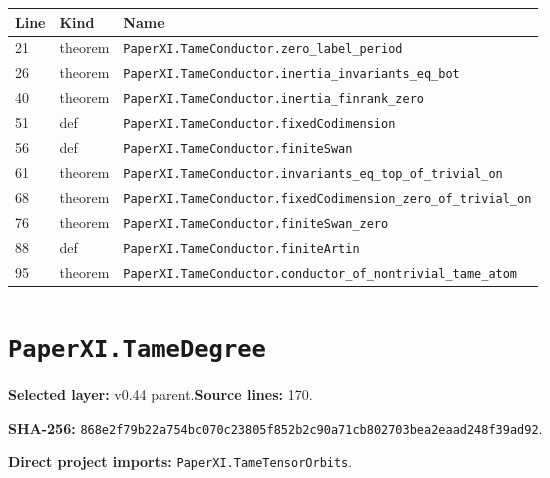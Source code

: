 \documentclass[10pt,oneside]{book}
\begin{document}
\begin{longtable}{@{}p{}p{}p{}@{}}\toprule Line&Kind&Name\\\midrule\endhead

21&theorem&\nolinkurl{PaperXI.TameConductor.zero_label_period}\\

26&theorem&\nolinkurl{PaperXI.TameConductor.inertia_invariants_eq_bot}\\

40&theorem&\nolinkurl{PaperXI.TameConductor.inertia_finrank_zero}\\

51&def&\nolinkurl{PaperXI.TameConductor.fixedCodimension}\\

56&def&\nolinkurl{PaperXI.TameConductor.finiteSwan}\\

61&theorem&\nolinkurl{PaperXI.TameConductor.invariants_eq_top_of_trivial_on}\\

68&theorem&\nolinkurl{PaperXI.TameConductor.fixedCodimension_zero_of_trivial_on}\\

76&theorem&\nolinkurl{PaperXI.TameConductor.finiteSwan_zero}\\

88&def&\nolinkurl{PaperXI.TameConductor.finiteArtin}\\

95&theorem&\nolinkurl{PaperXI.TameConductor.conductor_of_nontrivial_tame_atom}\\

\bottomrule\end{longtable}

\section{\texorpdfstring{\nolinkurl{PaperXI.TameDegree}}{PaperXI.TameDegree}}\label{module:PaperXI.TameDegree}

\textbf{Selected layer:} v0.44 parent.\quad\textbf{Source lines:} 170.\par\textbf{SHA-256:} {\scriptsize\nolinkurl{868e2f79b22a754bc070c23805f852b2c90a71cb802703bea2eaad248f39ad92}}.


\textbf{Direct project imports:} \nolinkurl{PaperXI.TameTensorOrbits}.
\end{document}
